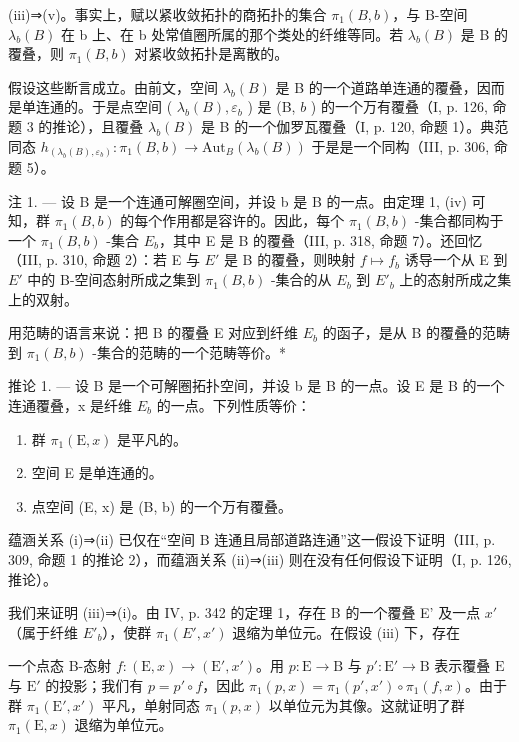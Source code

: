 (iii)⇒(v)。事实上，赋以紧收敛拓扑的商拓扑的集合 \(\pi_{1}(B,b)\)，与 B-空间 \(\lambda_{b}(B)\) 在 b 上、在 b 处常值圈所属的那个类处的纤维等同。若 \(\lambda_{b}(B)\) 是 B 的覆叠，则 \(\pi_{1}(B,b)\) 对紧收敛拓扑是离散的。

假设这些断言成立。由前文，空间 \(\lambda_b(B)\) 是 B 的一个道路单连通的覆叠，因而是单连通的。于是点空间 ( \(\lambda_b(B), \varepsilon_b\) ) 是 (B, \(b\) ) 的一个万有覆叠（I, p. 126, 命题 3 的推论），且覆叠 \(\lambda_b(B)\) 是 B 的一个伽罗瓦覆叠（I, p. 120, 命题 1）。典范同态 \(h_{(\lambda_b(B), \varepsilon_b)}: \pi_1(B, b) \to \text{Aut}_B(\lambda_b(B))\) 于是是一个同构（III, p. 306, 命题 5）。

注 1. --- 设 B 是一个连通可解圈空间，并设 b 是 B 的一点。由定理 1, (iv) 可知，群 \(\pi_{1}(B,b)\) 的每个作用都是容许的。因此，每个 \(\pi_{1}(B,b)\) -集合都同构于一个 \(\pi_{1}(B,b)\) -集合 \(E_{b}\)，其中 E 是 B 的覆叠（III, p. 318, 命题 7）。还回忆（III, p. 310, 命题 2）：若 E 与 \(E'\) 是 B 的覆叠，则映射 \(f \mapsto f_{b}\) 诱导一个从 E 到 \(E'\) 中的 B-空间态射所成之集到 \(\pi_{1}(B,b)\) -集合的从 \(E_{b}\) 到 \(E'_{b}\) 上的态射所成之集上的双射。

用范畴的语言来说：把 B 的覆叠 E 对应到纤维 \(E_b\) 的函子，是从 B 的覆叠的范畴到 \(\pi_1(B,b)\) -集合的范畴的一个范畴等价。*

推论 1. --- 设 B 是一个可解圈拓扑空间，并设 b 是 B 的一点。设 E 是 B 的一个连通覆叠，x 是纤维 \(E_{b}\) 的一点。下列性质等价：

\begin{enumerate}
\def\labelenumi{(\roman{enumi})}
\item
  群 \(\pi_{1}(\mathrm{E},x)\) 是平凡的。
\item
  空间 E 是单连通的。
\item
  点空间 (E, x) 是 (B, b) 的一个万有覆叠。
\end{enumerate}

蕴涵关系 (i)⇒(ii) 已仅在“空间 B 连通且局部道路连通”这一假设下证明（III, p. 309, 命题 1 的推论 2），而蕴涵关系 (ii)⇒(iii) 则在没有任何假设下证明（I, p. 126, 推论）。

我们来证明 (iii)⇒(i)。由 IV, p. 342 的定理 1，存在 B 的一个覆叠 E' 及一点 \(x'\)（属于纤维 \(E'_{b}\)），使群 \(\pi_1(E', x')\) 退缩为单位元。在假设 (iii) 下，存在

一个点态 B-态射 \(f \colon (\mathrm{E}, x) \to (\mathrm{E}', x')\)。用 \(p \colon \mathrm{E} \to \mathrm{B}\) 与 \(p' \colon \mathrm{E}' \to \mathrm{B}\) 表示覆叠 \(\mathrm{E}\) 与 \(\mathrm{E}'\) 的投影；我们有 \(p = p' \circ f\)，因此 \(\pi_1(p, x) = \pi_1(p', x') \circ \pi_1(f, x)\)。由于群 \(\pi_1(\mathrm{E}', x')\) 平凡，单射同态 \(\pi_1(p, x)\) 以单位元为其像。这就证明了群 \(\pi_1(\mathrm{E}, x)\) 退缩为单位元。

